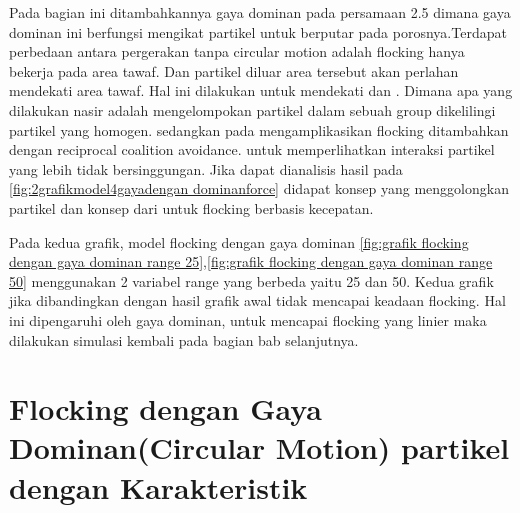 \hspace{0.6cm} Pada bagian ini ditambahkannya gaya dominan pada persamaan 2.5 dimana gaya dominan ini berfungsi mengikat partikel untuk berputar pada porosnya.Terdapat perbedaan antara pergerakan tanpa circular motion adalah flocking hanya bekerja pada area tawaf. Dan partikel diluar area tersebut akan perlahan mendekati area tawaf. Hal ini dilakukan untuk mendekati \citep{Nasir2016} dan \citep{Kim2014}. Dimana apa yang dilakukan nasir adalah mengelompokan partikel dalam sebuah group dikelilingi partikel yang homogen. sedangkan pada \citep{Kim2014} mengamplikasikan flocking ditambahkan dengan reciprocal coalition avoidance. untuk memperlihatkan interaksi partikel yang lebih tidak bersinggungan. Jika dapat dianalisis hasil pada \ref{fig:2grafikmodel4gayadengan dominanforce} didapat konsep \citep{Nasir2016} yang menggolongkan partikel dan konsep dari \citep{Kim2014} untuk flocking berbasis kecepatan.

\hspace{0.6cm}Pada kedua grafik, model flocking dengan gaya dominan \ref{fig:grafik flocking dengan gaya dominan range 25},\ref{fig:grafik flocking dengan gaya dominan range 50} menggunakan 2 variabel range yang berbeda yaitu 25 dan 50. Kedua grafik jika dibandingkan dengan hasil grafik awal tidak mencapai keadaan flocking. Hal ini dipengaruhi oleh gaya dominan, untuk mencapai flocking yang linier maka dilakukan simulasi kembali pada bagian bab selanjutnya. 

\section{Flocking dengan Gaya Dominan(Circular Motion) partikel dengan Karakteristik}%


